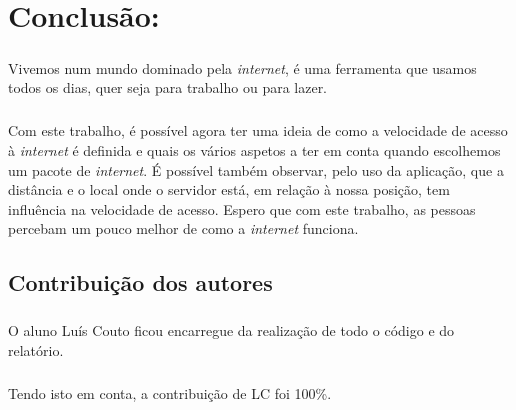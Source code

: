 \documentclass{report}
\begin{document}
\chapter{Conclusão:}
\label{chap:conclusao}
\paragraph{}	
Vivemos num mundo dominado pela \textit{internet}, é uma ferramenta que usamos todos os dias, quer seja para trabalho ou para lazer.
\paragraph{}
Com este trabalho, é possível agora ter uma ideia de como a velocidade de acesso à \textit{internet} é definida e quais os vários aspetos a ter em conta quando escolhemos um pacote de \textit{internet}. É possível também observar, pelo uso da aplicação, que a distância e o local onde o servidor está, em relação à nossa posição, tem influência na velocidade de acesso.
Espero que com este trabalho, as pessoas percebam um pouco melhor de como a \textit{internet} funciona.

\section{Contribuição dos autores}
\paragraph{}
O aluno Luís Couto ficou encarregue da realização de todo o código e do relatório.
\paragraph{}
Tendo isto em conta, a contribuição de LC foi 100\%.


\printbibliography
\end{document}
